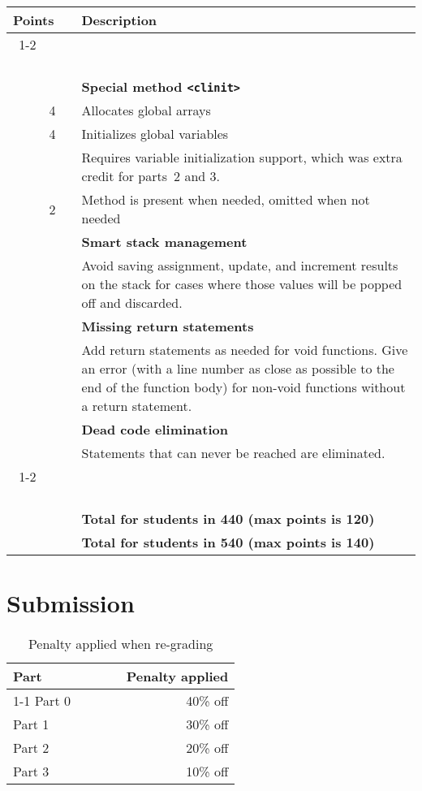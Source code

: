 \documentclass{article}
\makeatletter
\newcommand{\gradeline}{ \cline{1-2} \cline{4-4} ~\\[-1.5ex] }
\newenvironment{gradetable}{\begin{longtable}{@{~~}rrcp{5in}} \multicolumn{2}{l}{\bf Points} & & {\bf Description}\\ \gradeline}{\end{longtable}}
\newcommand{\mainitem}[2]{\pagebreak[2] {\bf #1} &&& {\bf #2}}
\newcommand{\mainpara}[1]{~ &&& {#1} }
\newcommand{\inneritem}[2]{~ & #1 && #2}
\newcommand{\innerpara}[1]{~ & ~ && #1}
\newcommand{\parser}{2}
\newcommand{\typecheck}{3}
\makeatother
\begin{document}
\begin{gradetable}
  \mainitem{10}{Special method {\tt <clinit>}}
  \\[1mm]
  \inneritem{4}{Allocates global arrays}
  \\[1mm]
  \inneritem{4}{Initializes global variables}
  \\
  \innerpara{%
    Requires variable initialization support,
    which was extra credit for parts~\parser{} and \typecheck{}.
  }
  \\[1mm]
  \inneritem{2}{Method is present when needed, omitted when not needed}
  \\[4mm]

  \mainitem{4}{Smart stack management}
  \\[1mm]
  \mainpara{%
    Avoid saving assignment, update, and increment results on
    the stack for cases where those values will be popped off
    and discarded.
  }
  \\[4mm]

  \mainitem{4}{Missing return statements}
  \\[1mm]
  \mainpara{%
    Add return statements as needed for void functions.
    Give an error (with a line number as close as possible
    to the end of the function body) for non-void functions
    without a return statement.
  }
  \\[4mm]

  \mainitem{4}{Dead code elimination}
  \\[1mm]
  \mainpara{%
    Statements that can never be reached are eliminated.
  }
  \\[4mm]

  \gradeline
  \mainitem{100}{Total for students in 440 (max points is 120)}
  \\
  \mainitem{120}{Total for students in 540 (max points is 140)}
\end{gradetable}


\section{Submission}

\begin{table}[h]
\centering

  \begin{tabular}{lcr}
    {\bf Part} & ~~~~ & {\bf Penalty applied} \\ \cline{1-1}\cline{3-3}
    Part 0 && 40\% off \\
    Part 1 && 30\% off \\
    Part \parser{} && 20\% off \\
    Part \typecheck{} && 10\% off
  \end{tabular}

\caption{Penalty applied when re-grading}
\label{TAB:penalties}
\end{table}
\end{document}
